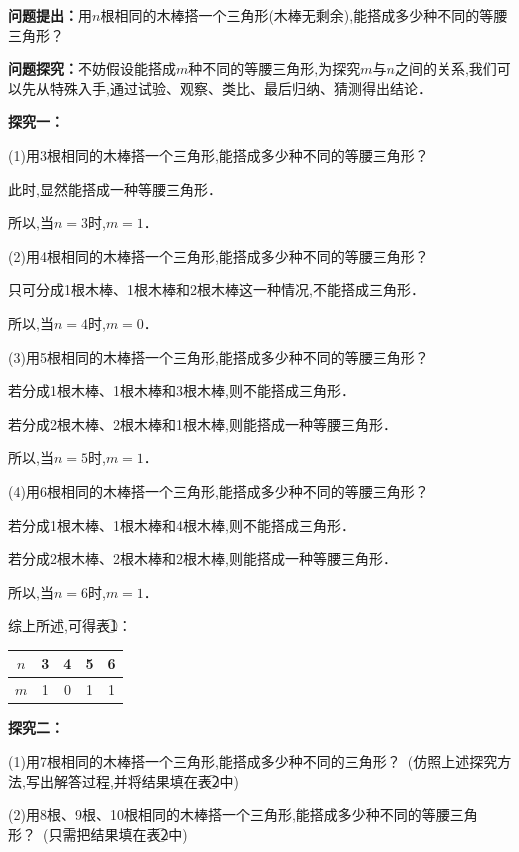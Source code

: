 \documentclass[10pt,a4paper]{ctexart}
\newcommand{\nianfen}[1]{\hspace{-2em}{(#1\textbf{·}\textit{青岛}\textbf{·}23)}}
\begin{document}
	\mbox{}
	
	\nianfen{2015}
	
	\textbf{问题提出：}用$ n $根相同的木棒搭一个三角形(木棒无剩余),能搭成多少种不同的等腰三角形？
	
	\textbf{问题探究：}不妨假设能搭成$ m $种不同的等腰三角形,为探究$ m $与$ n $之间的关系,我们可以先从特殊入手,通过试验、观察、类比、最后归纳、猜测得出结论． 
	
	\textbf{探究一：}
	
	(1)用3根相同的木棒搭一个三角形,能搭成多少种不同的等腰三角形？
	
	此时,显然能搭成一种等腰三角形．
	
	所以,当$ n=3 $时,$ m=1 $． 
	
	(2)用4根相同的木棒搭一个三角形,能搭成多少种不同的等腰三角形？
	
	只可分成1根木棒、1根木棒和2根木棒这一种情况,不能搭成三角形．
	
	所以,当$ n=4 $时,$ m=0 $． 
	
	(3)用5根相同的木棒搭一个三角形,能搭成多少种不同的等腰三角形？
	
	若分成1根木棒、1根木棒和3根木棒,则不能搭成三角形．
	
	若分成2根木棒、2根木棒和1根木棒,则能搭成一种等腰三角形．
	
	所以,当$ n=5 $时,$ m=1 $．
	
	(4)用6根相同的木棒搭一个三角形,能搭成多少种不同的等腰三角形？
	
	若分成1根木棒、1根木棒和4根木棒,则不能搭成三角形．
	
	若分成2根木棒、2根木棒和2根木棒,则能搭成一种等腰三角形．
	
	所以,当$ n=6 $时,$ m=1 $．
	
	综上所述,可得表\textcircled{1}：
	
	\begin{center}
		\begin{tabular}{|c|c|c|c|c|}
		\hline 
		$n$ & 3 & 4 & 5 & 6 \\ 
		\hline 
		$m$ & 1 & 0 & 1 & 1 \\ 
		\hline 
	\end{tabular} 
	\end{center}
	
	\textbf{探究二：}
	
	(1)用7根相同的木棒搭一个三角形,能搭成多少种不同的三角形？ (仿照上述探究方法,写出解答过程,并将结果填在表\textcircled{2}中) 
	
	(2)用8根、9根、10根相同的木棒搭一个三角形,能搭成多少种不同的等腰三角形？ (只需把结果填在表\textcircled{2}中)
	
\end{document}
